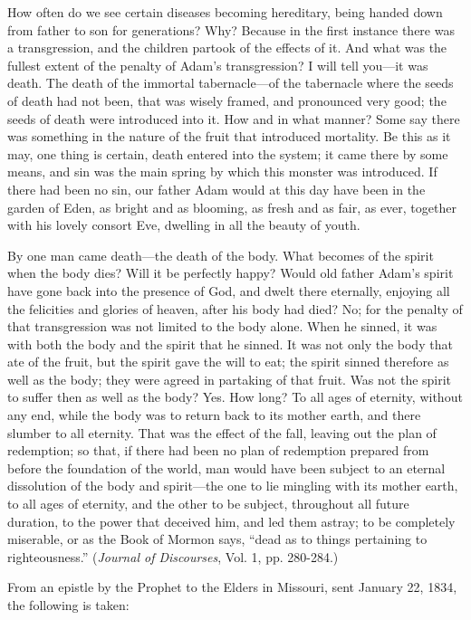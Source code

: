 How often do we see certain diseases becoming hereditary, being handed down from father
to son for generations? Why? Because in the first instance there was a transgression, and the
children partook of the effects of it. And what was the fullest extent of the penalty of Adam's
transgression? I will tell you—it was death. The death of the immortal tabernacle—of the
tabernacle where the seeds of death had not been, that was wisely framed, and pronounced
very good; the seeds of death were introduced into it. How and in what manner? Some say
there was something in the nature of the fruit that introduced mortality. Be this as it may, one
thing is certain, death entered into the system; it came there by some means, and sin was the
main spring by which this monster was introduced. If there had been no sin, our father Adam
would at this day have been in the garden of Eden, as bright and as blooming, as fresh and as
fair, as ever, together with his lovely consort Eve, dwelling in all the beauty of youth.

By one man came death—the death of the body. What becomes of the spirit when the body
dies? Will it be perfectly happy? Would old father Adam's spirit have gone back into the
presence of God, and dwelt there eternally, enjoying all the felicities and glories of heaven,
after his body had died? No; for the penalty of that transgression was not limited to the body
alone. When he sinned, it was with both the body and the spirit that he sinned. It was not only
the body that ate of the fruit, but the spirit gave the will to eat; the spirit sinned therefore as
well as the body; they were agreed in partaking of that fruit. Was not the spirit to suffer then
as well as the body? Yes. How long? To all ages of eternity, without any end, while the body
was to return back to its mother earth, and there slumber to all eternity. That was the effect of
the fall, leaving out the plan of redemption; so that, if there had been no plan of redemption
prepared from before the foundation of the world, man would have been subject to an eternal
dissolution of the body and spirit—the one to lie mingling with its mother earth, to all ages of
eternity, and the other to be subject, throughout all future duration, to the power that deceived
him, and led them astray; to be completely miserable, or as the Book of Mormon says, ``dead
as to things pertaining to righteousness.'' (\textit{Journal of Discourses}, Vol. 1, pp. 280-284.)

From an epistle by the Prophet to the Elders in Missouri, sent January 22, 1834, the
following is taken:

